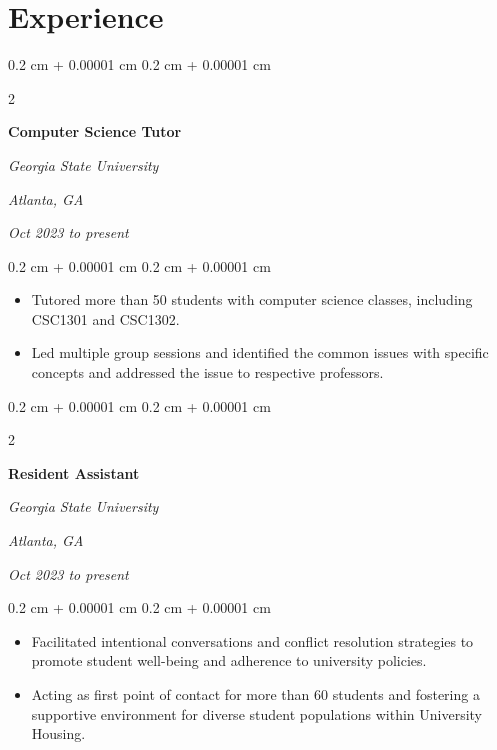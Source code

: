 \documentclass[12pt, letterpaper]{article}
\newenvironment{highlights}{
    \begin{itemize}[
        topsep=0.10 cm,
        parsep=0.10 cm,
        partopsep=0pt,
        itemsep=0pt,
        leftmargin=0.4 cm + 10pt
    ]
}{
    \end{itemize}
} %
\newenvironment{onecolentry}{
    \begin{adjustwidth}{
        0.2 cm + 0.00001 cm
    }{
        0.2 cm + 0.00001 cm
    }
}{
    \end{adjustwidth}
} %
\newenvironment{twocolentry}[2][]{
    \onecolentry
    \def\secondColumn{#2}
    \setcolumnwidth{\fill, 4.5 cm}
    \begin{paracol}{2}
}{
    \switchcolumn \raggedleft \secondColumn
    \end{paracol}
    \endonecolentry
} %
\begin{document}
    
    \section{Experience}



        
        \begin{twocolentry}{
        \textit{Atlanta, GA}

        \textit{Oct 2023 to present}}
            \textbf{Computer Science Tutor}

            \textit{Georgia State University}
        \end{twocolentry}

        \vspace{0.10 cm}
        \begin{onecolentry}
            \begin{highlights}
                \item Tutored more than 50 students with computer science classes, including CSC1301 and CSC1302.
                \item Led multiple group sessions and identified the common issues with specific concepts and addressed the issue to respective professors.
            \end{highlights}
        \end{onecolentry}


        \vspace{0.2 cm}

        \begin{twocolentry}{
        \textit{Atlanta, GA}

        \textit{Oct 2023 to present}}
            \textbf{Resident Assistant}

            \textit{Georgia State University}
        \end{twocolentry}

        \vspace{0.10 cm}
        \begin{onecolentry}
            \begin{highlights}
                \item Facilitated intentional conversations and conflict resolution strategies to promote student well-being and adherence to university policies.
                \item Acting as first point of contact for more than 60 students and fostering a supportive environment for diverse student populations within University Housing.
            \end{highlights}
        \end{onecolentry}
\end{document}
